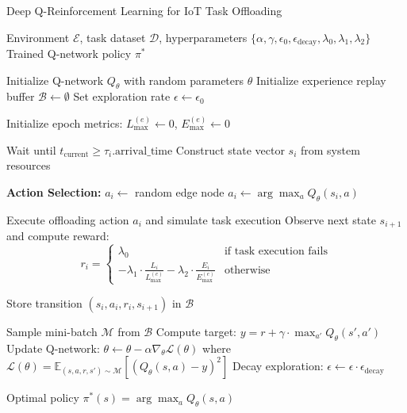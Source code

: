 \documentclass[preprint,12pt]{elsarticle}
\begin{document}
\begin{algorithm}[H]
\caption{Deep Q-Reinforcement Learning for IoT Task Offloading}
\label{alg:dqrl_iot_offloading}
\begin{algorithmic}[1]
\REQUIRE Environment $\mathcal{E}$, task dataset $\mathcal{D}$, hyperparameters $\{\alpha, \gamma, \epsilon_0, \epsilon_{\text{decay}}, \lambda_0, \lambda_1, \lambda_2\}$
\ENSURE Trained Q-network policy $\pi^*$

\STATE Initialize Q-network $Q_\theta$ with random parameters $\theta$
\STATE Initialize experience replay buffer $\mathcal{B} \leftarrow \emptyset$
\STATE Set exploration rate $\epsilon \leftarrow \epsilon_0$

    \STATE Initialize epoch metrics: $L_{\max}^{(e)} \leftarrow 0$, $E_{\max}^{(e)} \leftarrow 0$
    
        \STATE Wait until $t_{\text{current}} \geq \tau_i.\text{arrival\_time}$
        \STATE Construct state vector $s_i$ from system resources
        
        \STATE \textbf{Action Selection:}
            \STATE $a_i \leftarrow$ random edge node
        \ELSE
            \STATE $a_i \leftarrow \arg\max_{a} Q_\theta(s_i, a)$
        \ENDIF
        
        \STATE Execute offloading action $a_i$ and simulate task execution
        \STATE Observe next state $s_{i+1}$ and compute reward:
        \begin{equation}
        r_i = \begin{cases}
        \lambda_0 & \text{if task execution fails} \\[0.5em]
        -\lambda_1 \cdot \frac{L_i}{L_{\max}^{(e)}} - \lambda_2 \cdot \frac{E_i}{E_{\max}^{(e)}} & \text{otherwise}
        \end{cases}
        \end{equation}
        
        \STATE Store transition $(s_i, a_i, r_i, s_{i+1})$ in $\mathcal{B}$
        
            \STATE Sample mini-batch $\mathcal{M}$ from $\mathcal{B}$
                \STATE Compute target: $y = r + \gamma \cdot \max_{a'} Q_\theta(s', a')$
            \ENDFOR
            \STATE Update Q-network: $\theta \leftarrow \theta - \alpha \nabla_\theta \mathcal{L}(\theta)$
            \STATE where $\mathcal{L}(\theta) = \mathbb{E}_{(s,a,r,s') \sim \mathcal{M}}[(Q_\theta(s,a) - y)^2]$
            \STATE Decay exploration: $\epsilon \leftarrow \epsilon \cdot \epsilon_{\text{decay}}$
        \ENDIF
    \ENDFOR
\ENDFOR

\RETURN Optimal policy $\pi^*(s) = \arg\max_a Q_\theta(s,a)$
\end{algorithmic}
\end{algorithm}
\end{document}
